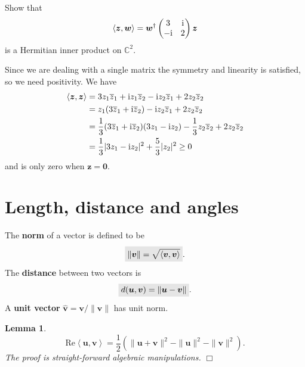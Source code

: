 \documentclass[letter-paper]{tufte-book}
\newtheorem{lemma}[theorem]{\color{pastel-blue}Lemma}
\newenvironment{example}[1][Example]{\begin{trivlist}
\item[\hskip \labelsep {\bfseries #1}]}{\end{trivlist}}
\newcommand{\zi}{{\rm i}}
\newcommand{\inner}[2]{\left\langle #1, #2\right\rangle}
\newcommand{\Ob}{{\boldsymbol{0}}}
\newcommand{\ub}{{\boldsymbol{u}}}
\newcommand{\vb}{{\boldsymbol{v}}}
\newcommand{\wb}{{\boldsymbol{w}}}
\newcommand{\zb}{{\boldsymbol{z}}}
\newcommand{\qedwhite}{\hfill \ensuremath{\Box}}
\newcommand{\highlight}[1]{\mathchoice%
  {\colorbox{black!10}{$\displaystyle#1$}}%
  {\colorbox{black!10}{$\textstyle#1$}}%
  {\colorbox{black!10}{$\scriptstyle#1$}}%
  {\colorbox{black!10}{$\scriptscriptstyle#1$}}}%
\begin{document}
\begin{example}
  Show that
  \begin{equation*}
    \inner{\zb}{\wb} = \wb^\dagger \begin{pmatrix} 3 & \zi \\ -\zi & 2 \end{pmatrix} \zb
  \end{equation*}
  is a Hermitian inner product on $\mathbb{C}^2$.
  
  Since we are dealing with a single matrix the symmetry and linearity is satisfied, so we need positivity. We have
  \begin{align*}
    \inner{\zb}{\zb} 
      &= 3 z_1 \overline{z}_1 + \zi z_1 \overline{z}_2 - \zi z_2 \overline{z}_1 + 2 z_2 \overline{z}_2 \\
      &=z_1 (3\overline{z}_1 + \zi \overline{z}_2) - \zi z_2 \overline{z}_1 + 2 z_2 \overline{z}_2 \\
      &= \frac{1}{3}(3\overline{z}_1 + \zi \overline{z}_2)(3 z_1 - \zi z_2) - \frac{1}{3} z_2 \overline{z}_2 + 2 z_2 \overline{z}_2 \\
      &= \frac{1}{3}|3 z_1 - \zi z_2|^2 + \frac{5}{3}|z_2|^2 \geq 0
  \end{align*}
  and is only zero when $\zb = \Ob$.
\end{example}


\section{Length, distance and angles}

The \textbf{norm} of a vector is defined to be
\begin{equation}
  \highlight{\|\vb\| = \sqrt{\inner{\vb}{\vb}}}.
\end{equation}
The \textbf{distance} between two vectors is
\begin{equation}
  \highlight{d(\ub, \vb) = \|\ub - \vb\|}.
\end{equation}
A \textbf{unit vector} $\hat{\vb} = \vb / \|\vb\|$ has unit norm.

\begin{lemma}\label{lemma:real_part}
  \begin{equation*}
    \mbox{Re}\inner{\ub}{\vb} = \frac{1}{2}\left(\|\ub+\vb\|^2 - \|\ub\|^2 - \|\vb\|^2\right).
  \end{equation*}
  The proof is straight-forward algebraic manipulations. \qedwhite
\end{lemma}
\end{document}
